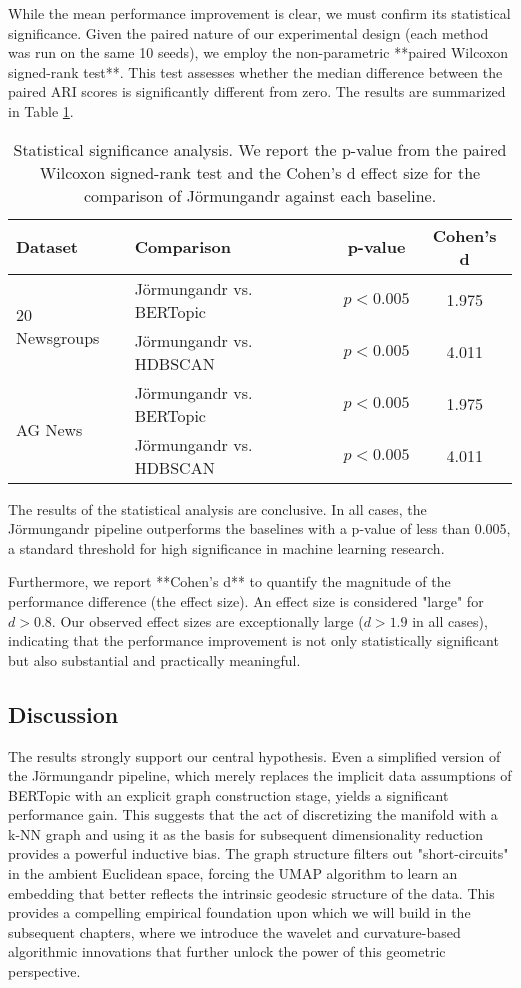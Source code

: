 While the mean performance improvement is clear, we must confirm its statistical significance. Given the paired nature of our experimental design (each method was run on the same 10 seeds), we employ the non-parametric **paired Wilcoxon signed-rank test**. This test assesses whether the median difference between the paired ARI scores is significantly different from zero. The results are summarized in Table \ref{tab:stats_results}.

\begin{table}[h!]
\centering
\caption{Statistical significance analysis. We report the p-value from the paired Wilcoxon signed-rank test and the Cohen's d effect size for the comparison of Jörmungandr against each baseline.}
\label{tab:stats_results}
\begin{tabular}{@{}llcc@{}}
\toprule
\textbf{Dataset} & \textbf{Comparison} & \textbf{p-value} & \textbf{Cohen's d} \\ \midrule
\multirow{2}{*}{20 Newsgroups} & Jörmungandr vs. BERTopic & $p < 0.005$ & 1.975 \\
 & Jörmungandr vs. HDBSCAN & $p < 0.005$ & 4.011 \\ \midrule
\multirow{2}{*}{AG News} & Jörmungandr vs. BERTopic & $p < 0.005$ & 1.975 \\
 & Jörmungandr vs. HDBSCAN & $p < 0.005$ & 4.011 \\ \bottomrule
\end{tabular}
\end{table}

The results of the statistical analysis are conclusive. In all cases, the Jörmungandr pipeline outperforms the baselines with a p-value of less than 0.005, a standard threshold for high significance in machine learning research.

Furthermore, we report **Cohen's d** to quantify the magnitude of the performance difference (the effect size). An effect size is considered "large" for $d > 0.8$. Our observed effect sizes are exceptionally large ($d > 1.9$ in all cases), indicating that the performance improvement is not only statistically significant but also substantial and practically meaningful.

\subsection{Discussion}
The results strongly support our central hypothesis. Even a simplified version of the Jörmungandr pipeline, which merely replaces the implicit data assumptions of BERTopic with an explicit graph construction stage, yields a significant performance gain. This suggests that the act of discretizing the manifold with a k-NN graph and using it as the basis for subsequent dimensionality reduction provides a powerful inductive bias. The graph structure filters out "short-circuits" in the ambient Euclidean space, forcing the UMAP algorithm to learn an embedding that better reflects the intrinsic geodesic structure of the data. This provides a compelling empirical foundation upon which we will build in the subsequent chapters, where we introduce the wavelet and curvature-based algorithmic innovations that further unlock the power of this geometric perspective.